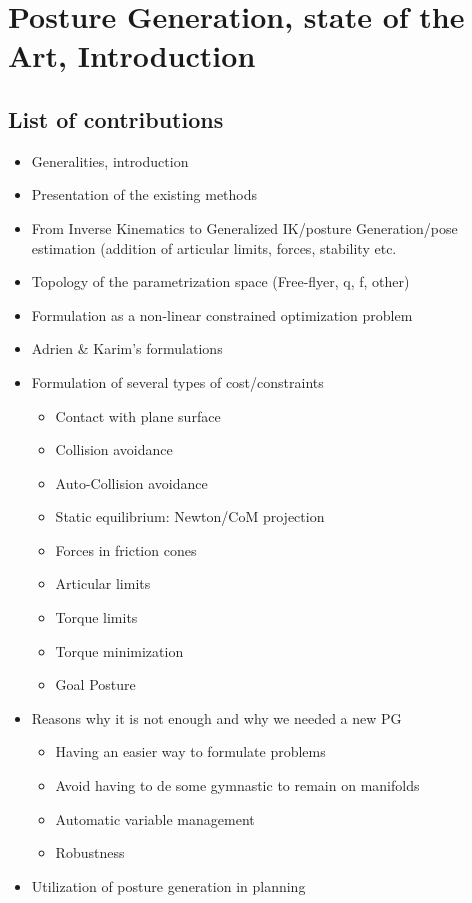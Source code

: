 
\chapter{Posture Generation, state of the Art, Introduction}




\graphicspath{{Chapter1/Figs/Vector/}{Chapter1/Figs/}}

\section{List of contributions}
\begin{itemize}
  \item Generalities, introduction
  \item Presentation of the existing methods
  \item From Inverse Kinematics to Generalized IK/posture Generation/pose estimation (addition of articular limits, forces, stability etc.
  \item Topology of the parametrization space (Free-flyer, q, f, other)
  \item Formulation as a non-linear constrained optimization problem
  \item Adrien \& Karim's formulations
  \item Formulation of several types of cost/constraints
  \begin{itemize}
    \item Contact with plane surface
    \item Collision avoidance
    \item Auto-Collision avoidance
    \item Static equilibrium: Newton/CoM projection
    \item Forces in friction cones
    \item Articular limits
    \item Torque limits
    \item Torque minimization
    \item Goal Posture
  \end{itemize}
  \item Reasons why it is not enough and why we needed a new PG
    \begin{itemize}
      \item Having an easier way to formulate problems
      \item Avoid having to de some gymnastic to remain on manifolds
      \item Automatic variable management
      \item Robustness
    \end{itemize}
  \item Utilization of posture generation in planning
\end{itemize}


